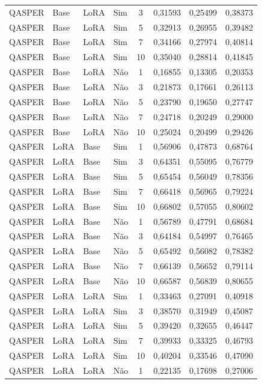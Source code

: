 \begin{longtable}{llllcccc}
QASPER & Base & LoRA & Sim & 3 & 0,31593 & 0,25499 & 0,38373 \\
QASPER & Base & LoRA & Sim & 5 & 0,32913 & 0,26955 & 0,39482 \\
QASPER & Base & LoRA & Sim & 7 & 0,34166 & 0,27974 & 0,40814 \\
QASPER & Base & LoRA & Sim & 10 & 0,35040 & 0,28814 & 0,41845 \\
QASPER & Base & LoRA & Não & 1 & 0,16855 & 0,13305 & 0,20353 \\
QASPER & Base & LoRA & Não & 3 & 0,21873 & 0,17661 & 0,26113 \\
QASPER & Base & LoRA & Não & 5 & 0,23790 & 0,19650 & 0,27747 \\
QASPER & Base & LoRA & Não & 7 & 0,24718 & 0,20249 & 0,29000 \\
QASPER & Base & LoRA & Não & 10 & 0,25024 & 0,20499 & 0,29426 \\
QASPER & LoRA & Base & Sim & 1 & 0,56906 & 0,47873 & 0,68764 \\
QASPER & LoRA & Base & Sim & 3 & 0,64351 & 0,55095 & 0,76779 \\
QASPER & LoRA & Base & Sim & 5 & 0,65454 & 0,56049 & 0,78356 \\
QASPER & LoRA & Base & Sim & 7 & 0,66418 & 0,56965 & 0,79224 \\
QASPER & LoRA & Base & Sim & 10 & 0,66802 & 0,57055 & 0,80602 \\
QASPER & LoRA & Base & Não & 1 & 0,56789 & 0,47791 & 0,68684 \\
QASPER & LoRA & Base & Não & 3 & 0,64184 & 0,54997 & 0,76465 \\
QASPER & LoRA & Base & Não & 5 & 0,65492 & 0,56082 & 0,78382 \\
QASPER & LoRA & Base & Não & 7 & 0,66139 & 0,56652 & 0,79114 \\
QASPER & LoRA & Base & Não & 10 & 0,66587 & 0,56839 & 0,80655 \\
QASPER & LoRA & LoRA & Sim & 1 & 0,33463 & 0,27091 & 0,40918 \\
QASPER & LoRA & LoRA & Sim & 3 & 0,38570 & 0,31949 & 0,45087 \\
QASPER & LoRA & LoRA & Sim & 5 & 0,39420 & 0,32655 & 0,46447 \\
QASPER & LoRA & LoRA & Sim & 7 & 0,39933 & 0,33325 & 0,46793 \\
QASPER & LoRA & LoRA & Sim & 10 & 0,40204 & 0,33546 & 0,47090 \\
QASPER & LoRA & LoRA & Não & 1 & 0,22135 & 0,17698 & 0,27006 \\

\end{longtable}
